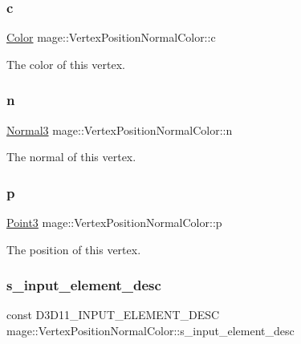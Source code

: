 \subsubsection{\texorpdfstring{c}{c}}
{\footnotesize\ttfamily \hyperlink{structmage_1_1_color}{Color} mage\+::\+Vertex\+Position\+Normal\+Color\+::c}

The color of this vertex. \hypertarget{structmage_1_1_vertex_position_normal_color_a771c7e71e8b6441b73f513f511507650}{}\label{structmage_1_1_vertex_position_normal_color_a771c7e71e8b6441b73f513f511507650} 
\subsubsection{\texorpdfstring{n}{n}}
{\footnotesize\ttfamily \hyperlink{structmage_1_1_normal3}{Normal3} mage\+::\+Vertex\+Position\+Normal\+Color\+::n}

The normal of this vertex. \hypertarget{structmage_1_1_vertex_position_normal_color_a6847c367ca68fb8d8e349c8441ae63dd}{}\label{structmage_1_1_vertex_position_normal_color_a6847c367ca68fb8d8e349c8441ae63dd} 
\subsubsection{\texorpdfstring{p}{p}}
{\footnotesize\ttfamily \hyperlink{structmage_1_1_point3}{Point3} mage\+::\+Vertex\+Position\+Normal\+Color\+::p}

The position of this vertex. \hypertarget{structmage_1_1_vertex_position_normal_color_a1d14ae159608683093a33b38fb6259e4}{}\label{structmage_1_1_vertex_position_normal_color_a1d14ae159608683093a33b38fb6259e4} 
\subsubsection{\texorpdfstring{s\+\_\+input\+\_\+element\+\_\+desc}{s\_input\_element\_desc}}
{\footnotesize\ttfamily const D3\+D11\+\_\+\+I\+N\+P\+U\+T\+\_\+\+E\+L\+E\+M\+E\+N\+T\+\_\+\+D\+E\+SC mage\+::\+Vertex\+Position\+Normal\+Color\+::s\+\_\+input\+\_\+element\+\_\+desc\hspace{0.3cm}{\ttfamily [static]}}

